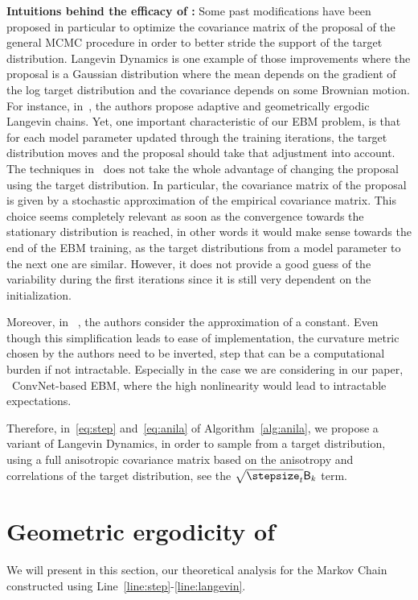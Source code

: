 \documentclass{article} %
\begin{document}
\textbf{Intuitions behind the efficacy of \algo:}
Some past modifications have been proposed in particular to optimize the covariance matrix of the proposal of the general MCMC procedure in order to better stride the support of the target distribution. 
Langevin Dynamics is one example of those improvements where the proposal is a Gaussian distribution where the mean depends on the gradient of the log target distribution and the covariance depends on some Brownian motion.
For instance, in~\citet{atchade2006adaptive,marshall2012adaptive}, the authors propose adaptive and geometrically ergodic Langevin chains. 
Yet, one important characteristic of our EBM problem, is that for each model parameter updated through the training iterations, the target distribution moves and the proposal should take that adjustment into account.
The techniques in~\citet{atchade2006adaptive,marshall2012adaptive} does not take the whole advantage of changing the proposal using the target distribution. 
In particular, the covariance matrix of the proposal is given by a stochastic approximation of the empirical covariance matrix. 
This choice seems completely relevant as soon as the convergence towards the stationary distribution is reached, in other words it would make sense towards the end of the EBM training, as the target distributions from a model parameter to the next one are similar. 
However, it does not provide a good guess of the variability during the first iterations since it is still very dependent on the initialization. 

Moreover, in ~\citet{girolami2011riemann}, the authors consider the approximation of a constant. Even though this simplification leads to ease of implementation, the curvature metric chosen by the authors need to be inverted, step that can be a computational burden if not intractable. 
Especially in the case we are considering in our paper, \ie\ ConvNet-based EBM, where the high nonlinearity would lead to intractable expectations.

Therefore, in~\eqref{eq:step} and~\eqref{eq:anila} of Algorithm~\ref{alg:anila}, we propose a variant of Langevin Dynamics, in order to sample from a target distribution, using a full anisotropic covariance matrix based on the anisotropy and correlations of the target distribution, see the $\sqrt{\stepsize_t} \mathsf{B}_k$ term. 


\section{Geometric ergodicity of \algo\ }\label{sec:theory}
We will present in this section, our theoretical analysis for the Markov Chain constructed using Line~\ref{line:step}-\ref{line:langevin}. 
\end{document}
